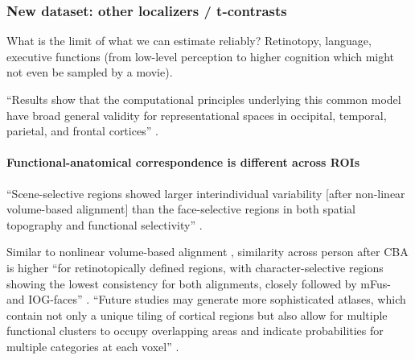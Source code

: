 \subsubsection{New dataset: other localizers / t-contrasts}

What is the limit of what we can estimate reliably?
%
Retinotopy, language, executive functions (from low-level perception to higher
cognition which might not even be sampled by a movie).

``Results show that the computational principles underlying this common
model have broad general validity for representational spaces in occipital,
temporal, parietal, and frontal cortices'' \citep{guntupalli2016model}.




\paragraph{Functional-anatomical correspondence is different across ROIs}

``Scene-selective regions showed larger interindividual variability [after
non-linear volume-based alignment] than the face-selective regions in both
spatial topography and functional selectivity'' \citet{zhen2017quantifying}.


Similar to nonlinear volume-based alignment , similarity across person after CBA
is higher ``for retinotopically defined regions, with character-selective
regions showing the lowest consistency for both alignments, closely followed by
mFus- and IOG-faces'' \citep{rosenke2021probabilistic}.
%
``Future studies may generate more sophisticated atlases, which contain not only
a unique tiling of cortical regions but also allow for multiple functional
clusters to occupy overlapping areas and indicate probabilities for multiple
categories at each voxel'' \citep{rosenke2021probabilistic}.

